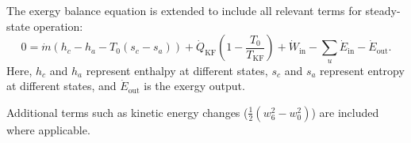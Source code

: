 The exergy balance equation is extended to include all relevant terms for steady-state operation:  
\[
0 = \dot{m} \left( h_c - h_a - T_0 (s_c - s_a) \right) + \dot{Q}_{\text{KF}} \left( 1 - \frac{T_0}{T_{\text{KF}}} \right) + \dot{W}_{\text{in}} - \sum_{u} \dot{E}_{\text{in}} - \dot{E}_{\text{out}}.
\]  
Here, \( h_c \) and \( h_a \) represent enthalpy at different states, \( s_c \) and \( s_a \) represent entropy at different states, and \( \dot{E}_{\text{out}} \) is the exergy output.  

Additional terms such as kinetic energy changes (\( \frac{1}{2} (w_6^2 - w_0^2) \)) are included where applicable.